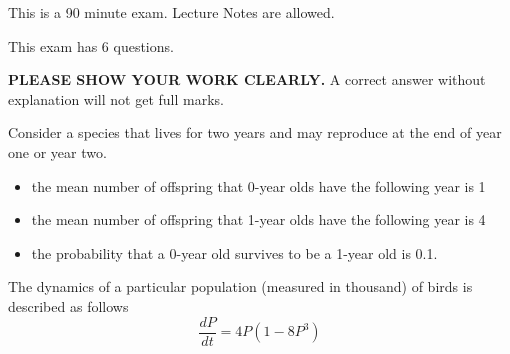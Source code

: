 \documentclass[12pt]{exam}
\begin{document}
\vspace{.5in}

This is a 90 minute exam. Lecture Notes are allowed.

\vspace{.2in} This exam has 6 questions.

\vspace{.2in} {\bf \Large PLEASE SHOW YOUR WORK CLEARLY.} A correct answer without explanation will not get full marks. \vspace{.5in}
\begin{center}
\gradetable[v]
\end{center}



\newpage



\begin{questions}
\question[15]
Consider a species that lives for two years and may reproduce at the end of year one or
year two. 
\begin{itemize}
\item the mean number of offspring that 0-year olds have the following year is 1
\item the mean number of offspring that 1-year olds have the following year is 4
\item the probability that a 0-year old survives to be a 1-year old is 0.1.
\end{itemize}


\question[8]
The dynamics of a particular population (measured in thousand) of birds is described as follows
$$\frac{dP}{dt}=4P(1-8P^3)$$
\end{questions}
\end{document}
